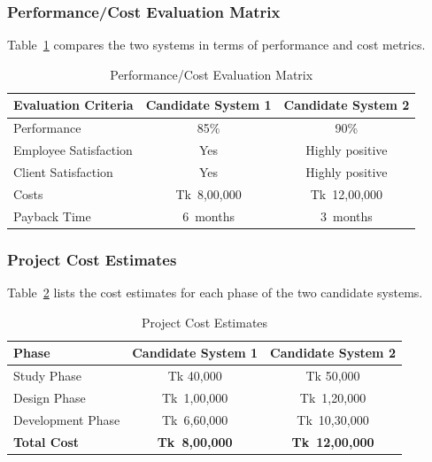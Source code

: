 \documentclass[12pt,a4paper]{article}
\begin{document}
\subsubsection{Performance/Cost Evaluation Matrix}
Table~\ref{tab:performance_cost} compares the two systems in terms of performance and cost metrics.

\begin{table}[H]
    \centering
    \renewcommand{\arraystretch}{1.3}
    \begin{tabular}{|p{4cm}|c|c|}
        \hline
        \rowcolor{tableheader}
        \textcolor{headertext}{\textbf{Evaluation Criteria}} & \textcolor{headertext}{\textbf{Candidate System 1}} & \textcolor{headertext}{\textbf{Candidate System 2}} \\
        \hline
        Performance & 85\% & 90\% \\
        \hline
        Employee Satisfaction & Yes & Highly positive \\
        \hline
        Client Satisfaction & Yes & Highly positive \\
        \hline
        Costs & Tk 8{,}00{,}000 & Tk 12{,}00{,}000 \\
        \hline
        Payback Time & 6 months & 3 months \\
        \hline
    \end{tabular}
    \caption{Performance/Cost Evaluation Matrix}
    \label{tab:performance_cost}
\end{table}

\newpage
\subsubsection{Project Cost Estimates}
Table~\ref{tab:cost_estimates} lists the cost estimates for each phase of the two candidate systems.

\begin{table}[H]
    \centering
    \renewcommand{\arraystretch}{1.3}
    \begin{tabular}{|p{3cm}|c|c|}
        \hline
        \rowcolor{tableheader}
        \textcolor{headertext}{\textbf{Phase}} & \textcolor{headertext}{\textbf{Candidate System 1}} & \textcolor{headertext}{\textbf{Candidate System 2}} \\
        \hline
        Study Phase & Tk 40{,}000 & Tk 50{,}000 \\
        \hline
        Design Phase & Tk 1{,}00{,}000 & Tk 1{,}20{,}000 \\
        \hline
        Development Phase & Tk 6{,}60{,}000 & Tk 10{,}30{,}000 \\
        \hline
        \textbf{Total Cost} & \textbf{Tk 8{,}00{,}000} & \textbf{Tk 12{,}00{,}000} \\
        \hline
    \end{tabular}
    \caption{Project Cost Estimates}
    \label{tab:cost_estimates}
\end{table}
\end{document}
